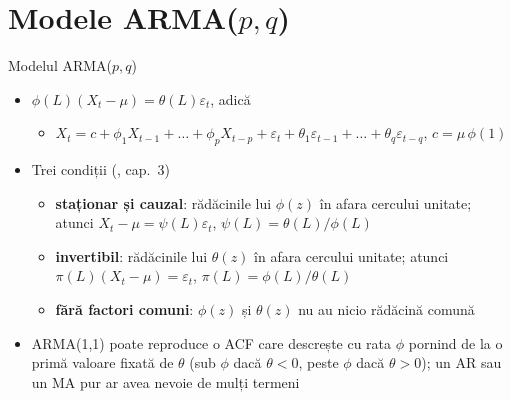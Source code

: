 \section{Modele ARMA($p,q$)}

\begin{frame}{Modelul ARMA($p,q$)}
\itemsize{\small}
\begin{itemize}
    \item $\phi(L)(X_t - \mu) = \theta(L)\varepsilon_t$, adică
    \begin{itemize}
        \item $X_t = c + \phi_1X_{t-1} + \dots + \phi_pX_{t-p} + \varepsilon_t + \theta_1\varepsilon_{t-1} + \dots + \theta_q\varepsilon_{t-q}$, $c = \mu\,\phi(1)$
    \end{itemize}
    \item Trei condiții (, cap.~3)
    \begin{itemize}
        \item \textbf{staționar și cauzal}: rădăcinile lui $\phi(z)$ în afara cercului unitate; atunci $X_t - \mu = \psi(L)\varepsilon_t$, $\psi(L) = \theta(L)/\phi(L)$
        \item \textbf{invertibil}: rădăcinile lui $\theta(z)$ în afara cercului unitate; atunci $\pi(L)(X_t - \mu) = \varepsilon_t$, $\pi(L) = \phi(L)/\theta(L)$
        \item \textbf{fără factori comuni}: $\phi(z)$ și $\theta(z)$ nu au nicio rădăcină comună
    \end{itemize}
    \item ARMA(1,1) poate reproduce o ACF care descrește cu rata $\phi$ pornind de la o primă valoare fixată de $\theta$ (sub $\phi$ dacă $\theta < 0$, peste $\phi$ dacă $\theta > 0$); un AR sau un MA pur ar avea nevoie de mulți termeni
\end{itemize}
\end{frame}

